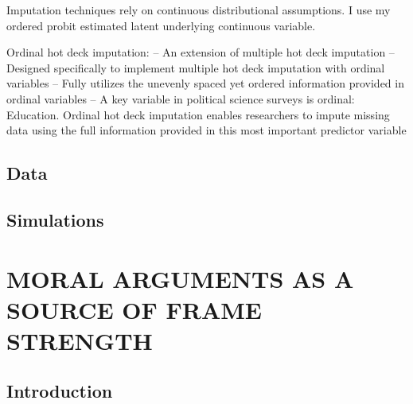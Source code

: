 \documentclass[12pt,econ]{sources/authesis}
\begin{document}
Imputation techniques rely on continuous distributional assumptions.
I use my ordered probit estimated latent underlying continuous variable.

Ordinal hot deck imputation:
-- An extension of multiple hot deck imputation
-- Designed specifically to implement multiple hot deck imputation with ordinal variables
-- Fully utilizes the unevenly spaced yet ordered information provided in ordinal variables
-- A key variable in political science surveys is ordinal: Education. Ordinal hot deck imputation enables researchers to impute missing data using the full information provided in this most important predictor variable

\hypertarget{ordmiss-data}{%
\section{Data}\label{ordmiss-data}}

\hypertarget{ordmiss-sims}{%
\section{Simulations}\label{ordmiss-sims}}

\hypertarget{framing}{%
\chapter{MORAL ARGUMENTS AS A SOURCE OF FRAME STRENGTH}\label{framing}}

\hypertarget{framing-intro}{%
\section{Introduction}\label{framing-intro}}
\end{document}
